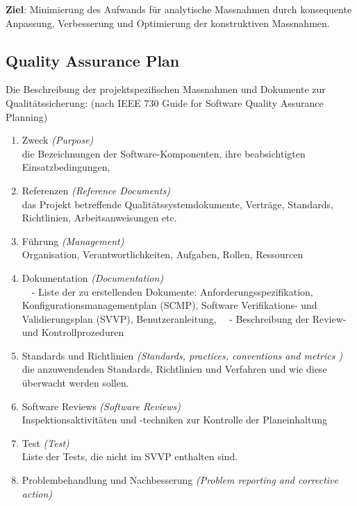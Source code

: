 {\bfseries Ziel}: Minimierung des Aufwands für analytische Massnahmen durch
konsequente Anpassung, Verbesserung und Optimierung der konstruktiven
Massnahmen.
\ifslides
\newpage
\fi
\subsection{Quality Assurance Plan}
Die Beschreibung der projektspezifischen Massnahmen und Dokumente zur
Qualitäts\-si\-che\-rung:
(nach IEEE 730 Guide for Software Quality Assurance Planning)
\begin{enumerate}
\item Zweck {\em (Purpose)}\\
  die Bezeichnungen der Software-Komponenten, ihre beabsichtigten
  Einsatzbedingungen,
\item Referenzen {\em (Reference Documents)}\\
 das Projekt betreffende Qualitätssystemdokumente,
       Verträge, Standards, Richtlinien, Arbeitsanweisungen etc.
\item Führung {\em (Management)}\\
Organisation, Verantwortlichkeiten, Aufgaben, Rollen, Ressourcen
\item Dokumentation {\em (Documentation)}\\
\ \ - Liste der zu erstellenden Dokumente: Anforderungsspezifikation,
Konfigurationsmanagementplan (SCMP), Software Verifikations- und
Validierungsplan (SVVP), Benutzeranleitung,
\ \ - Beschreibung der Review- und Kontrollprozeduren
\item Standards und Richtlinien {\em (Standards,
          practices, conventions and metrics )}\\
  die anzuwendenden Standards, Richtlinien und Verfahren und wie diese
          überwacht werden sollen.
\item Software Reviews {\em (Software Reviews)}\\
 Inspektionsaktivitäten und -techniken zur Kontrolle der Planeinhaltung
\item Test {\em (Test)}\\
   Liste der Tests, die nicht im SVVP enthalten sind.
 \item Problembehandlung und Nachbesserung {\em(Problem reporting and
 corrective action)}\\

\end{enumerate}
